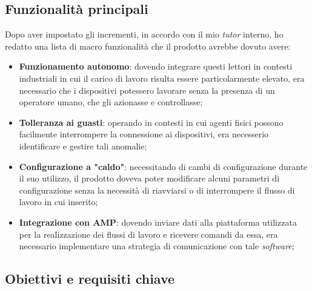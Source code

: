 \subsection{Funzionalità principali}
Dopo aver impostato gli incrementi, in accordo con il mio \emph{tutor} interno, ho redatto una lista di macro funzionalità che il prodotto avrebbe 
dovuto avere:
\begin{itemize}
    \item \textbf{Funzionamento autonomo}: dovendo integrare questi lettori in contesti industriali in cui il carico di lavoro risulta essere particolarmente 
    elevato, era necessario che i dispositivi potessero lavorare senza la presenza di un operatore umano, che gli azionasse e controllasse;
    \item \textbf{Tolleranza ai guasti}: operando in contesti in cui agenti fisici possono facilmente interrompere la connessione ai dispositivi, era necesserio
    identificare e gestire tali anomalie;
    \item \textbf{Configurazione a "caldo"}: necessitando di cambi di configurazione durante il suo utilizzo, il prodotto doveva poter modificare alcuni 
    parametri di configurazione senza la necessità di riavviarsi o di interrompere il flusso di lavoro in cui inserito;
    \item \textbf{Integrazione con AMP}: dovendo inviare dati alla  piattaforma utilizzata per la realizzazione dei flussi di lavoro e ricevere comandi da essa, 
    era necessario implementare una strategia di comunicazione con tale \emph{software};
\end{itemize}

\subsection{Obiettivi e requisiti chiave}

